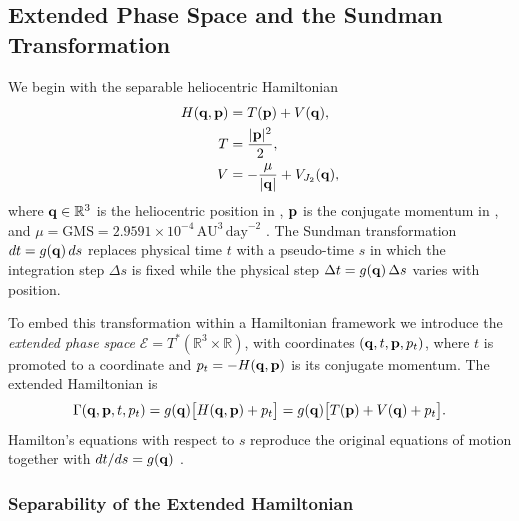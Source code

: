 
\subsection{Extended Phase Space and the Sundman Transformation}
\label{sec:extended_phase_space}

We begin with the separable heliocentric Hamiltonian
\begin{equation}
  \begin{aligned}[t]
    H(\mathbf{q}, \mathbf{p}) &= T(\mathbf{p}) + V(\mathbf{q}), \\
    T &= \frac{|\mathbf{p}|^2}{2}, \\
    V &= -\frac{\mu}{|\mathbf{q}|} + V_{J_2}(\mathbf{q}),
  \end{aligned}
  \label{eq:H_separable}
\end{equation}
where $\mathbf{q} \in \mathbb{R}^3$ is the heliocentric position in \pAU,
$\mathbf{p}$ is the conjugate momentum in \pAUd, and
$\mu = \mathrm{GMS} = 2.9591\times10^{-4}\,\mathrm{AU}^3\,\mathrm{day}^{-2}$
\citep{constants_iau2015}.
The Sundman transformation $dt = g(\mathbf{q})\,ds$ replaces physical
time $t$ with a pseudo-time $s$ in which the integration step
$\Delta s$ is fixed while the physical step
$\Delta t = g(\mathbf{q})\,\Delta s$ varies with position.

To embed this transformation within a Hamiltonian framework we
introduce the \textit{extended phase space}
$\mathcal{E} = T^*(\mathbb{R}^3 \times \mathbb{R})$, with
coordinates $(\mathbf{q}, t, \mathbf{p}, p_t)$, where $t$ is promoted to a
coordinate and $p_t = -H(\mathbf{q},\mathbf{p})$ is its conjugate momentum.
The extended Hamiltonian is
\begin{equation}
  \Gamma(\mathbf{q}, \mathbf{p}, t, p_t)
    = g(\mathbf{q})\bigl[H(\mathbf{q}, \mathbf{p}) + p_t\bigr]
    = g(\mathbf{q})\bigl[T(\mathbf{p}) + V(\mathbf{q}) + p_t\bigr].
  \label{eq:extended_hamiltonian}
\end{equation}
Hamilton's equations with respect to $s$ reproduce the original
equations of motion together with $dt/ds = g(\mathbf{q})$
\citep{PretoTremaine1999,HairerLubichWanner2006}.

\subsubsection{Separability of the Extended Hamiltonian}
\label{sec:separability}


